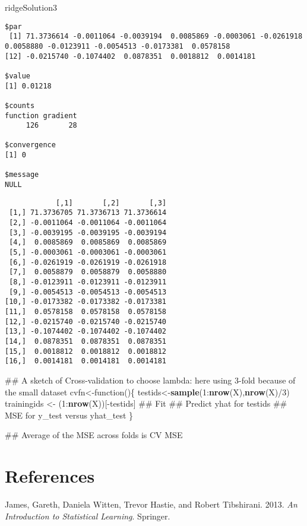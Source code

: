 \documentclass[10pt,]{article}
\newenvironment{Shaded}{\begin{snugshade}}{\end{snugshade}}
\newcommand{\KeywordTok}[1]{\textcolor[rgb]{0.13,0.29,0.53}{\textbf{{#1}}}}
\newcommand{\DecValTok}[1]{\textcolor[rgb]{0.00,0.00,0.81}{{#1}}}
\newcommand{\StringTok}[1]{\textcolor[rgb]{0.31,0.60,0.02}{{#1}}}
\newcommand{\NormalTok}[1]{{#1}}
\begin{document}
\begin{Shaded}
\begin{Highlighting}[]
\NormalTok{ridgeSolution3}
\end{Highlighting}
\end{Shaded}

\begin{verbatim}
$par
 [1] 71.3736614 -0.0011064 -0.0039194  0.0085869 -0.0003061 -0.0261918  0.0058880 -0.0123911 -0.0054513 -0.0173381  0.0578158
[12] -0.0215740 -0.1074402  0.0878351  0.0018812  0.0014181

$value
[1] 0.01218

$counts
function gradient 
     126       28 

$convergence
[1] 0

$message
NULL
\end{verbatim}

\begin{Shaded}
\end{Shaded}

\begin{verbatim}
            [,1]       [,2]       [,3]
 [1,] 71.3736705 71.3736713 71.3736614
 [2,] -0.0011064 -0.0011064 -0.0011064
 [3,] -0.0039195 -0.0039195 -0.0039194
 [4,]  0.0085869  0.0085869  0.0085869
 [5,] -0.0003061 -0.0003061 -0.0003061
 [6,] -0.0261919 -0.0261919 -0.0261918
 [7,]  0.0058879  0.0058879  0.0058880
 [8,] -0.0123911 -0.0123911 -0.0123911
 [9,] -0.0054513 -0.0054513 -0.0054513
[10,] -0.0173382 -0.0173382 -0.0173381
[11,]  0.0578158  0.0578158  0.0578158
[12,] -0.0215740 -0.0215740 -0.0215740
[13,] -0.1074402 -0.1074402 -0.1074402
[14,]  0.0878351  0.0878351  0.0878351
[15,]  0.0018812  0.0018812  0.0018812
[16,]  0.0014181  0.0014181  0.0014181
\end{verbatim}

\begin{Shaded}
\begin{Highlighting}[]
\NormalTok{## A sketch of Cross-validation to choose lambda: here using 3-fold because of the small dataset}
\NormalTok{cvfn<-function()\{}
  \NormalTok{testids<-}\KeywordTok{sample}\NormalTok{(}\DecValTok{1}\NormalTok{:}\KeywordTok{nrow}\NormalTok{(X),}\KeywordTok{nrow}\NormalTok{(X)/}\DecValTok{3}\NormalTok{)}
  \NormalTok{trainingids <-}\StringTok{ }\NormalTok{(}\DecValTok{1}\NormalTok{:}\KeywordTok{nrow}\NormalTok{(X))[-testids]}
  \NormalTok{## Fit}
  \NormalTok{## Predict yhat for testids}
  \NormalTok{## MSE for y_test versus yhat_test}
\NormalTok{\}}

\NormalTok{## Average of the MSE across folds is CV MSE}
\end{Highlighting}
\end{Shaded}

\section*{References}\label{references}

\hypertarget{refs}{}
\hypertarget{ref-james2013introduction}{}
James, Gareth, Daniela Witten, Trevor Hastie, and Robert Tibshirani.
2013. \emph{An Introduction to Statistical Learning}. Springer.
\end{document}
